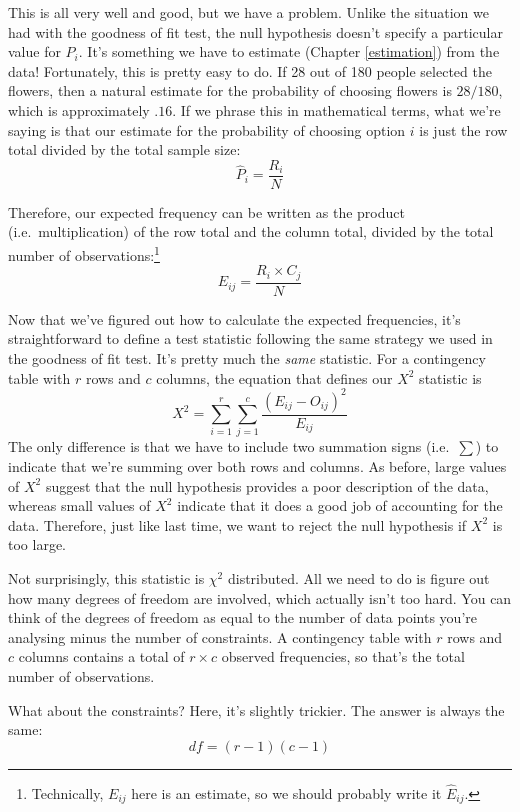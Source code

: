 \documentclass[
]{book}
\theoremstyle{definition}
\theoremstyle{definition}
\theoremstyle{definition}
\theoremstyle{definition}
\theoremstyle{remark}
\begin{document}
This is all very well and good, but we have a problem. Unlike the situation we had with the goodness of fit test, the null hypothesis doesn't specify a particular value for \(P_i\). It's something we have to estimate (Chapter \ref{estimation}) from the data! Fortunately, this is pretty easy to do. If 28 out of 180 people selected the flowers, then a natural estimate for the probability of choosing flowers is \(28/180\), which is approximately \(.16\). If we phrase this in mathematical terms, what we're saying is that our estimate for the probability of choosing option \(i\) is just the row total divided by the total sample size:
\[
\hat{P}_i = \frac{R_i}{N}
\]

Therefore, our expected frequency can be written as the product (i.e.~multiplication) of the row total and the column total, divided by the total number of observations:\footnote{Technically, \(E_{ij}\) here is an estimate, so we should probably write it \(\hat{E}_{ij}\).}
\[
E_{ij} = \frac{R_i \times C_j}{N}
\]

Now that we've figured out how to calculate the expected frequencies, it's straightforward to define a test statistic following the same strategy we used in the goodness of fit test. It's pretty much the \emph{same} statistic. For a contingency table with \(r\) rows and \(c\) columns, the equation that defines our \(X^2\) statistic is
\[ 
X^2 = \sum_{i=1}^r \sum_{j=1}^c \frac{({E}_{ij} - O_{ij})^2}{{E}_{ij}}
\]
The only difference is that we have to include two summation signs (i.e.~\(\sum\)) to indicate that we're summing over both rows and columns. As before, large values of \(X^2\) suggest that the null hypothesis provides a poor description of the data, whereas small values of \(X^2\) indicate that it does a good job of accounting for the data. Therefore, just like last time, we want to reject the null hypothesis if \(X^2\) is too large.

Not surprisingly, this statistic is \(\chi^2\) distributed. All we need to do is figure out how many degrees of freedom are involved, which actually isn't too hard. You can think of the degrees of freedom as equal to the number of data points you're analysing minus the number of constraints. A contingency table with \(r\) rows and \(c\) columns contains a total of \(r \times c\) observed frequencies, so that's the total number of observations.

What about the constraints? Here, it's slightly trickier. The answer is always the same:
\[
df = (r-1)(c-1)
\]
\end{document}
